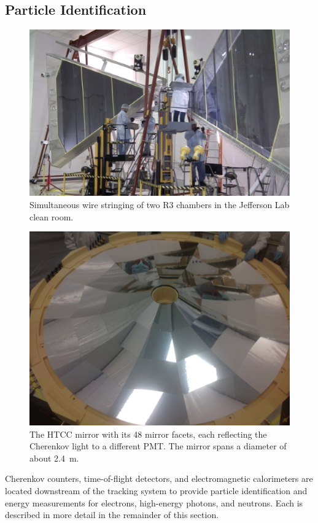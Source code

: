 \documentclass[final,3p,twocolumn]{elsarticle}
\begin{document}
\subsection{Particle Identification}
\begin{figure}[htbp!]
\centerline{\includegraphics[width=1.65\columnwidth]{DC-R3.png}}
\caption{Simultaneous wire stringing of two R3 chambers in the Jefferson Lab clean room.}
\label{dc-stringing}
\end{figure}
\begin{figure}[ht!]
\centerline{\includegraphics[angle=90,width=0.75\columnwidth]{HTCC-mirror.png}}
\caption{The HTCC mirror with its 48 mirror facets, each reflecting the Cherenkov light to a different PMT. The
  mirror spans a diameter of about 2.4~m.}
\label{htcc}
\end{figure}
Cherenkov counters, time-of-flight detectors, and electromagnetic calorimeters are located downstream of the
tracking system to provide particle identification and energy measurements for electrons, high-energy photons,
and neutrons.  Each is described in more detail in the remainder of this section.
\end{document}
